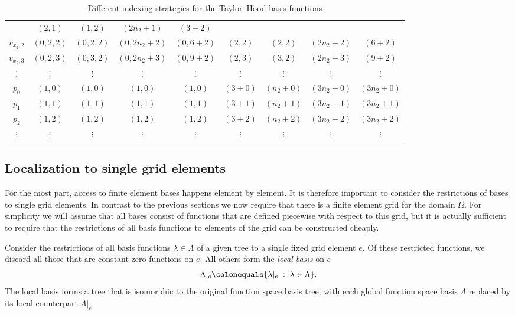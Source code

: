 \documentclass[a4paper,10pt,headings=normal,bibliography=totoc]{scrartcl}
\begin{document}
\begin{table}
\begin{center}
\begin{tabular}{c|c|c|c|c|c|c|c|c}
    & $(2,1)$
    & $(1,2)$
    & $(2n_2+1)$
    & $(3+2)$
    \\
  $v_{x_2,2}$
    & $(0,2,2)$
    & $(0,2,2)$
    & $(0,2n_2+2)$
    & $(0,6+2)$
    & $(2,2)$
    & $(2,2)$
    & $(2n_2+2)$
    & $(6+2)$
    \\
  $v_{x_2,3}$
    & $(0,2,3)$
    & $(0,3,2)$
    & $(0,2n_2+3)$
    & $(0,9+2)$
    & $(2,3)$
    & $(3,2)$
    & $(2n_2+3)$
    & $(9+2)$
    \\
  $\vdots$ & $\vdots$ & $\vdots$ & $\vdots$ &  $\vdots$ & $\vdots$ & $\vdots$ & $\vdots$ & $\vdots$
  \\
  $p_{0}$
    & $(1,0)$
    & $(1,0)$
    & $(1,0)$
    & $(1,0)$
    & $(3+0)$
    & $(n_2+0)$
    & $(3n_2+0)$
    & $(3n_2+0)$
    \\
  $p_{1}$
    & $(1,1)$
    & $(1,1)$
    & $(1,1)$
    & $(1,1)$
    & $(3+1)$
    & $(n_2+1)$
    & $(3n_2+1)$
    & $(3n_2+1)$
    \\
  $p_{2}$
    & $(1,2)$
    & $(1,2)$
    & $(1,2)$
    & $(1,2)$
    & $(3+2)$
    & $(n_2+2)$
    & $(3n_2+2)$
    & $(3n_2+2)$
    \\
  $\vdots$ & $\vdots$ & $\vdots$ & $\vdots$ &  $\vdots$ & $\vdots$ & $\vdots$ & $\vdots$ & $\vdots$
  \\
  \hline
\end{tabular}
\end{center}
\caption{Different indexing strategies for the Taylor--Hood basis functions}
\label{tab:th_indexing_variants}
\end{table}



\subsection{Localization to single grid elements}
\label{sec:localization}

For the most part, access to finite element bases happens element by element.  It is therefore important
to consider the restrictions of bases to single grid elements.  In contrast to the previous sections
we now require that there is a finite element grid for the domain $\Omega$. For simplicity we will
assume that all bases consist of functions that are defined piecewise with respect to this grid,
but it is actually sufficient to require that the restrictions of all basis functions to elements
of the grid can be constructed cheaply.

Consider the restrictions of all basis functions $\lambda \in \Lambda$ of a given tree to a single fixed grid element $e$.
Of these restricted functions, we discard all those that are constant zero functions on $e$.
All others form the \emph{local basis} on $e$
\begin{equation*}
 \Lambda|_e
 \colonequals
 \{ \lambda|_e \; : \; \lambda \in \Lambda \}.
\end{equation*}
The local basis forms a tree that is isomorphic to the original function space basis tree,
with each global function space basis $\Lambda$ replaced by its local counterpart $\Lambda|_e$.
\end{document}
